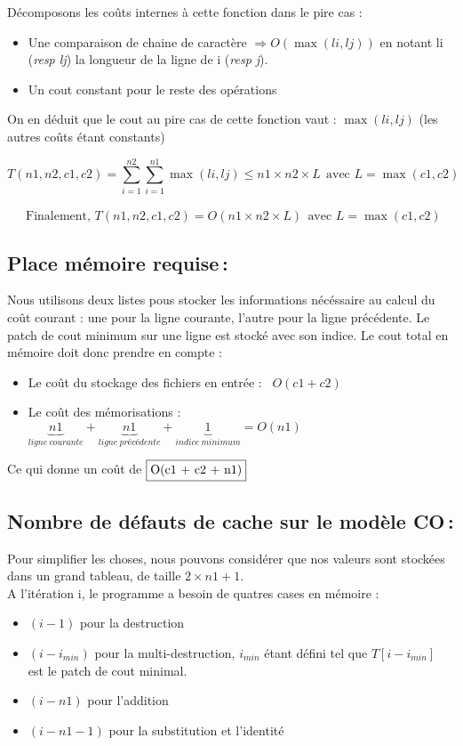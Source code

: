 \documentclass[a4paper, 10pt, french]{article}
\begin{document}
	Décomposons les coûts internes à cette fonction dans le pire cas :
	\begin{itemize}
	\item Une comparaison de chaine de caractère $\Rightarrow  O(\max(li,lj))$ en notant li (\textit{resp lj}) la longueur de la ligne de i (\textit{resp j}).
	\item Un cout constant pour le reste des opérations
	\end{itemize}

	On en déduit que le cout au pire cas de cette fonction vaut : $\max(li,lj)$ (les autres coûts étant constants)

	\[T(n1,n2,c1,c2) = \sum_{i=1}^{n2} \sum_{i=1}^{n1} \max(li,lj) \leq n1 \times n2 \times L \ \ \text{avec } L = \max(c1,c2)\]

	 \ \ \ $\text{Finalement, } T(n1,n2,c1,c2) = O(n1 \times n2 \times L)\ \ \text{avec } L = \max(c1,c2) $

  \subsection{Place mémoire requise\,: }
	Nous utilisons deux listes pous stocker les informations nécéssaire au calcul du coût courant : une pour la ligne courante, l'autre pour la ligne
    précédente. Le patch de cout minimum sur une ligne est stocké avec son indice.
    Le cout total en mémoire doit donc prendre en compte :
    \begin{itemize}
    \item Le coût du stockage des fichiers en entrée : \ $O(c1 + c2)$
    \item Le coût des mémorisations :  $\underbrace{n1}_{ligne\ courante} + \underbrace{n1}_{ligne\ précédente} + \underbrace{1}_{indice \ minimum} = O(n1)$
    \end{itemize}

    Ce qui donne un coût de $\fbox{O(c1 + c2 + n1)}$

  \subsection{Nombre de défauts de cache sur le modèle CO\,: }
    Pour simplifier les choses, nous pouvons considérer que nos valeurs sont stockées dans un grand tableau, de taille $2 \times n1 + 1$.\\
    A l'itération i, le programme a besoin de quatres cases en mémoire :
    \begin{itemize}
    \item $(i-1)$ pour la destruction
    \item $(i - i_{min})$ pour la multi-destruction, $i_{min}$ étant défini tel que $T[i-i_{min}]$ est le patch de cout minimal.
    \item $(i - n1)$ pour l'addition
    \item $(i - n1 - 1)$ pour la substitution et l'identité
    \end{itemize}
\end{document}
